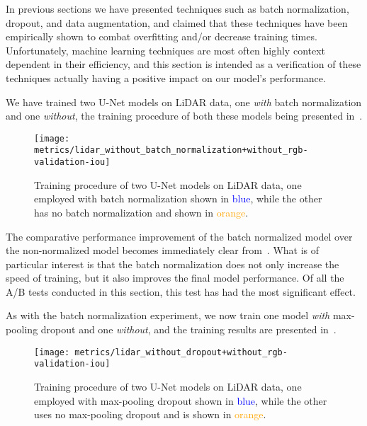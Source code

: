 In previous sections we have presented techniques such as batch normalization, dropout, and data augmentation, and claimed that these techniques have been empirically shown to combat overfitting and/or decrease training times.
Unfortunately, machine learning techniques are most often highly context dependent in their efficiency, and this section is intended as a verification of these techniques actually having a positive impact on our model's performance.


We have trained two U-Net models on LiDAR data, one \emph{with} batch normalization and one \emph{without}, the training procedure of both these models being presented in~.

\begin{figure}[H]
  \centering
  \texttt{[image: metrics/lidar\_without\_batch\_normalization+without\_rgb-validation-iou]}
  \caption{%
    Training procedure of two U-Net models on LiDAR data, one employed with batch normalization shown in \textcolor{blue}{blue}, while the other has no batch normalization and shown in \textcolor{orange}{orange}.
  }%
  \label{fig:batch-normalization-training}
\end{figure}

The comparative performance improvement of the batch normalized model over the non-normalized model becomes immediately clear from~.
What is of particular interest is that the batch normalization does not only increase the speed of training, but it also improves the final model performance.
Of all the A/B tests conducted in this section, this test has had the most significant effect.


As with the batch normalization experiment, we now train one model \emph{with} max-pooling dropout and one \emph{without}, and the training results are presented in~.

\begin{figure}[H]
  \centering
  \texttt{[image: metrics/lidar\_without\_dropout+without\_rgb-validation-iou]}
  \caption{%
    Training procedure of two U-Net models on LiDAR data, one employed with max-pooling dropout shown in \textcolor{blue}{blue}, while the other uses no max-pooling dropout and is shown in \textcolor{orange}{orange}.
  }
  \label{fig:dropout-training}
\end{figure}

